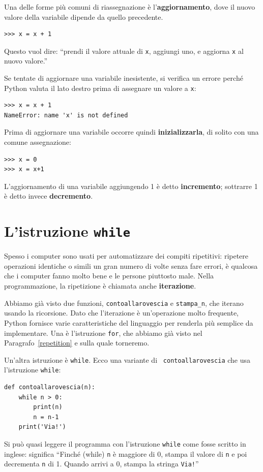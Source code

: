 \documentclass[10pt]{book}
\begin{document}
Una delle forme più comuni di riassegnazione è l'{\bf aggiornamento},
dove il nuovo valore della variabile dipende da quello precedente.

\begin{verbatim}
>>> x = x + 1
\end{verbatim}
%
Questo vuol dire: ``prendi il valore attuale di {\tt x}, aggiungi uno, e aggiorna {\tt x} al nuovo valore.''

Se tentate di aggiornare una variabile inesistente, si verifica un errore perché Python valuta il lato destro prima di assegnare un valore a {\tt x}:

\begin{verbatim}
>>> x = x + 1
NameError: name 'x' is not defined
\end{verbatim}
%
Prima di aggiornare una variabile occorre quindi {\bf inizializzarla},
di solito con una comune assegnazione:

\begin{verbatim}
>>> x = 0
>>> x = x+1
\end{verbatim}
%
L'aggiornamento di una variabile aggiungendo 1 è detto {\bf incremento};
sottrarre 1 è detto invece {\bf decremento}.


\section{L'istruzione {\tt while}}

Spesso i computer sono usati per automatizzare dei compiti ripetitivi: ripetere operazioni identiche o simili un gran numero di volte senza fare errori, è qualcosa che i computer fanno molto bene e le persone piuttosto male. Nella programmazione, la ripetizione è chiamata anche {\bf iterazione}.

Abbiamo già visto due funzioni, {\tt contoallarovescia} e \verb"stampa_n", che   iterano usando la ricorsione. Dato che l'iterazione è un'operazione molto frequente, Python fornisce varie caratteristiche del linguaggio per renderla più semplice da implementare. Una è l'istruzione {\tt for}, che abbiamo già visto nel Paragrafo~\ref{repetition} e sulla quale torneremo.

Un'altra istruzione è {\tt while}. Ecco una variante di {\tt
contoallarovescia} che usa l'istruzione {\tt while}:

\begin{verbatim}
def contoallarovescia(n):
    while n > 0:
        print(n)
        n = n-1
    print('Via!')
\end{verbatim}
%
Si può quasi leggere il programma con l'istruzione {\tt while} come fosse scritto in inglese: significa ``Finché (while) {\tt n} è maggiore di 0, stampa il valore di {\tt n} e poi decrementa {\tt n} di 1.  Quando arrivi a 0, stampa la stringa {\tt Via!}''
\end{document}
